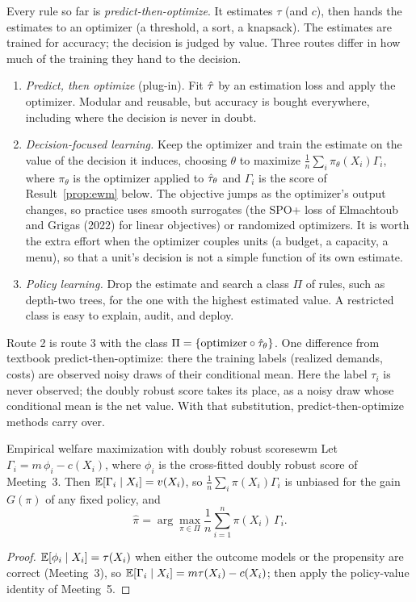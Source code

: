 \documentclass[11pt]{article}
\begin{document}
Every rule so far is \emph{predict-then-optimize}. It estimates $\tau$ (and $c$), then hands the estimates to an
optimizer (a threshold, a sort, a knapsack). The estimates are trained for accuracy; the decision is judged by value. Three routes
differ in how much of the training they hand to the decision.
\begin{enumerate}
  \item \emph{Predict, then optimize} (plug-in). Fit $\hat{\tau}$ by an estimation loss and apply the optimizer. Modular and
  reusable, but accuracy is bought everywhere, including where the decision is never in doubt.
  \item \emph{Decision-focused learning.} Keep the optimizer and train the estimate on the value of the decision it
  induces, choosing $\theta$ to maximize $\frac1n\sum_i \pi_\theta(X_i)\Gamma_i$, where $\pi_\theta$ is the optimizer applied to
  $\hat{\tau}_\theta$ and $\Gamma_i$ is the score of Result~\ref{prop:ewm} below. The objective jumps as the optimizer's output
  changes, so practice uses smooth surrogates (the SPO+ loss of Elmachtoub and Grigas (2022) for linear objectives) or
  randomized optimizers. It is worth the extra effort when the optimizer couples units (a budget, a capacity, a menu), so that
  a unit's decision is not a simple function of its own estimate.
  \item \emph{Policy learning.} Drop the estimate and search a class $\Pi$ of rules, such as depth-two trees, for the one with
  the highest estimated value. A restricted class is easy to explain, audit, and deploy.
\end{enumerate}
Route 2 is route 3 with the class $\Pi = \{\text{optimizer} \circ \hat{\tau}_\theta\}$. One difference from textbook
predict-then-optimize: there the training labels (realized demands, costs) are observed noisy draws of their conditional
mean. Here the label $\tau_i$ is never observed; the doubly robust score takes its place, as a noisy draw whose
conditional mean is the net value. With that substitution, predict-then-optimize methods carry over.

\begin{prop}{Empirical welfare maximization with doubly robust scores}{ewm}
Let $\Gamma_i = m\,\phi_i - c(X_i)$, where $\phi_i$ is the cross-fitted doubly robust score of Meeting~3. Then
$\mathbb{E}[\Gamma_i \mid X_i] = v(X_i)$, so $\frac1n\sum_i \pi(X_i)\Gamma_i$ is unbiased for the gain $G(\pi)$ of any fixed policy, and
\[
  \hat\pi = \arg\max_{\pi \in \Pi} \frac1n\sum_{i=1}^n \pi(X_i)\,\Gamma_i .
\]
\end{prop}
\begin{proof}
$\mathbb{E}[\phi_i \mid X_i] = \tau(X_i)$ when either the outcome models or the propensity are correct (Meeting~3), so
$\mathbb{E}[\Gamma_i \mid X_i] = m\tau(X_i) - c(X_i)$; then apply the policy-value identity of Meeting~5.
\end{proof}
\end{document}

